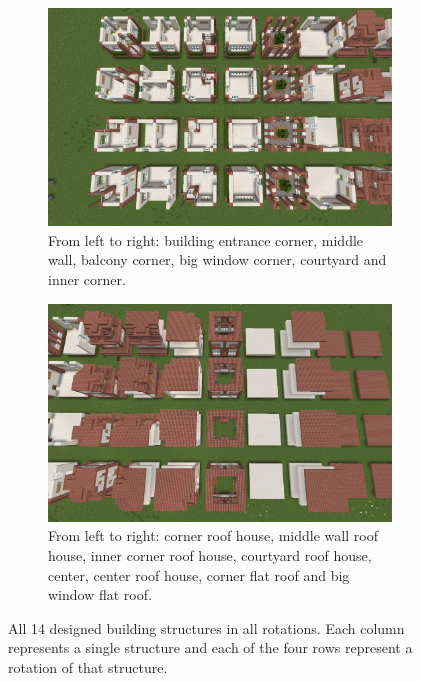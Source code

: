 \documentclass[
oneside,
fontsize=11pt
]{scrartcl}
\begin{document}
\begin{figure}[ht]
  \centering
  \begin{subfigure}{0.48\textwidth}
    \includegraphics[width=\textwidth]{images/structures/buidling-strucutres-rotations-1.png}
    \caption{From left to right: building entrance corner, middle wall,
              balcony corner, big window corner, courtyard and inner corner.}
  \end{subfigure}
  \hfill
  \begin{subfigure}{0.48\textwidth}
      \includegraphics[width=\textwidth]{images/structures/buidling-strucutres-rotations-2.png}
      \caption{From left to right: corner roof house, middle wall roof house, inner corner roof house,
              courtyard roof house, center, center roof house, corner flat roof and big window flat roof.}
  \end{subfigure}
  \caption{All 14 designed building structures in all rotations. 
    Each column represents a single structure and 
    each of the four rows represent a rotation of that structure. }
  \label{fig_building_strucutres_rotations}
\end{figure}
\end{document}
